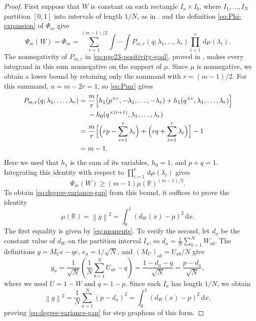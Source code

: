 \documentclass[11pt]{article}
\theoremstyle{remark}
\numberwithin{equation}{section}
\newcommand{\R}{\mathbb R}
\newcommand{\norm}[1]{\left\lVert #1\right\rVert}
\newcommand{\dd}{\,\mathrm d}
\newcommand{\dW}{d_W}
\newcommand{\rep}[2]{#1^{\times #2}}
\begin{document}
\begin{proof}
  First suppose that $W$ is constant on each rectangle $I_a\times I_b$,
  where $I_1,\ldots,I_N$ partition $[0,1]$ into intervals of length $1/N$,
  as in .
   and the definition \eqref{eq:Phi-expansion} of $\Phi_m$ give
  \[
    \Psi_m(W)=\Phi_m
    =\sum_{r=1}^{(m-1)/2}
      \int\!\cdots\!\int
      P_{m,r}(q;\lambda_1,\ldots,\lambda_r)
      \prod_{i=1}^r\dd\mu(\lambda_i).
  \]
  The nonnegativity of $P_{m,r}$ in \eqref{eq:pge23-positivity-goal}, proved in
  , makes every integrand in
  this sum nonnegative on the support of $\mu$. Since $\mu$ is nonnegative,
  we obtain a lower bound by retaining only the summand with $r=(m-1)/2$.
  For this summand, $n=m-2r=1$, so \eqref{eq:Pmr} gives
  \begin{align*}
    P_{m,r}(q;\lambda_1,\ldots,\lambda_r)
    ={}&\frac mr\Bigl[
      h_1(\rep pr,-\lambda_1,\ldots,-\lambda_r)
      +h_1(\rep qr,\lambda_1,\ldots,\lambda_r)
    \Bigr]\\
    &-h_0(\rep q{(r+1)},\lambda_1,\ldots,\lambda_r)\\
    ={}&\frac mr\Bigl[
      \Bigl(rp-\sum_{i=1}^r\lambda_i\Bigr)
      +\Bigl(rq+\sum_{i=1}^r\lambda_i\Bigr)
    \Bigr]-1\\
    ={}&m-1.
  \end{align*}
  Here we used that $h_1$ is the sum of its variables, $h_0=1$, and $p+q=1$.
  Integrating this identity with respect to $\prod_{i=1}^r\dd\mu(\lambda_i)$ gives
  \[
    \Psi_m(W)\ge(m-1)\mu(\R)^{(m-1)/2}.
  \]
  To obtain \eqref{eq:degree-variance-gap} from this bound, it suffices to prove the identity
  \[
    \mu(\R)=\norm g^2
    =\int_0^1(\dW(x)-p)^2\dd x.
  \]
  The first equality is given by \eqref{eq:moments}.
  To verify the second, let $d_a$ be the constant value of $\dW$
  on the partition interval $I_a$, so
  $d_a=\frac1N\sum_{b=1}^N W_{ab}$.
  The definitions $g=M_Ue-qe$, $e_a=1/\sqrt N$, and
  $(M_U)_{ab}=U_{ab}/N$ give
  \[
    g_a=\frac1{\sqrt N}\left(\frac1N\sum_{b=1}^N U_{ab}-q\right)
    =\frac{1-d_a-q}{\sqrt N}
    =\frac{p-d_a}{\sqrt N},
  \]
  where we used $U=1-W$ and $q=1-p$.
  Since each $I_a$ has length $1/N$, we obtain
  \[
    \norm g^2=\frac1N\sum_{a=1}^N(p-d_a)^2
    =\int_0^1(\dW(x)-p)^2\dd x,
  \]
  proving \eqref{eq:degree-variance-gap} for step graphons of this form.


\end{proof}
\end{document}
